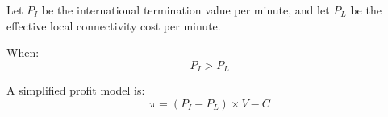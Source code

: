 \documentclass{article}
\begin{document}
	Let $P_I$ be the international termination value per minute, and let $P_L$ be the effective local connectivity cost per minute.
	
	When:
	\[
	P_I > P_L
	\]
	
	A simplified profit model is:
	\[π = (P_I − P_L) × V − C\]
\end{document}
